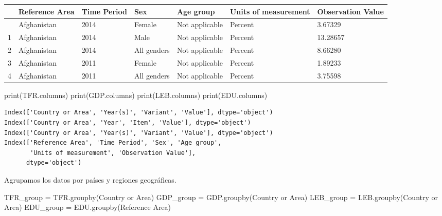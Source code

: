 \documentclass[
  letterpaper,
  DIV=11,
  numbers=noendperiod]{scrreprt}
\newenvironment{Shaded}{\begin{snugshade}}{\end{snugshade}}
\newcommand{\BuiltInTok}[1]{\textcolor[rgb]{0.00,0.23,0.31}{#1}}
\newcommand{\NormalTok}[1]{\textcolor[rgb]{0.00,0.23,0.31}{#1}}
\newcommand{\OperatorTok}[1]{\textcolor[rgb]{0.37,0.37,0.37}{#1}}
\newcommand{\StringTok}[1]{\textcolor[rgb]{0.13,0.47,0.30}{#1}}
\begin{document}
\begin{longtable}[]{@{}lllllll@{}}
\toprule\noalign{}
& Reference Area & Time Period & Sex & Age group & Units of measurement
& Observation Value \\
\midrule\noalign{}
\endhead
\bottomrule\noalign{}
\endlastfoot
0 & Afghanistan & 2014 & Female & Not applicable & Percent & 3.67329 \\
1 & Afghanistan & 2014 & Male & Not applicable & Percent & 13.28657 \\
2 & Afghanistan & 2014 & All genders & Not applicable & Percent &
8.66280 \\
3 & Afghanistan & 2011 & Female & Not applicable & Percent & 1.89233 \\
4 & Afghanistan & 2011 & All genders & Not applicable & Percent &
3.75598 \\
\end{longtable}

\begin{Shaded}
\begin{Highlighting}[]
\BuiltInTok{print}\NormalTok{(TFR.columns)}
\BuiltInTok{print}\NormalTok{(GDP.columns)}
\BuiltInTok{print}\NormalTok{(LEB.columns)}
\BuiltInTok{print}\NormalTok{(EDU.columns)}
\end{Highlighting}
\end{Shaded}

\begin{verbatim}
Index(['Country or Area', 'Year(s)', 'Variant', 'Value'], dtype='object')
Index(['Country or Area', 'Year', 'Item', 'Value'], dtype='object')
Index(['Country or Area', 'Year(s)', 'Variant', 'Value'], dtype='object')
Index(['Reference Area', 'Time Period', 'Sex', 'Age group',
       'Units of measurement', 'Observation Value'],
      dtype='object')
\end{verbatim}

Agrupamos los datos por países y regiones geográficas.

\begin{Shaded}
\begin{Highlighting}[]
\NormalTok{TFR\_group }\OperatorTok{=}\NormalTok{ TFR.groupby(}\StringTok{\textquotesingle{}Country or Area\textquotesingle{}}\NormalTok{)}
\NormalTok{GDP\_group }\OperatorTok{=}\NormalTok{ GDP.groupby(}\StringTok{\textquotesingle{}Country or Area\textquotesingle{}}\NormalTok{)}
\NormalTok{LEB\_group }\OperatorTok{=}\NormalTok{ LEB.groupby(}\StringTok{\textquotesingle{}Country or Area\textquotesingle{}}\NormalTok{)}
\NormalTok{EDU\_group }\OperatorTok{=}\NormalTok{ EDU.groupby(}\StringTok{\textquotesingle{}Reference Area\textquotesingle{}}\NormalTok{)}
\end{Highlighting}
\end{Shaded}
\end{document}
